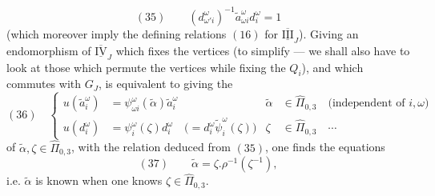 \[
(35)\qquad(d_{\omega'i}^\omega)^{-1}\widetilde a_{\omega i}^{\omega}d_i^\omega=1
\]
(which moreover imply the defining relations $(16)$ for $\overline{\underline{\mathrm{III}}}_J$). Giving an endomorphism of $\overline{\underline{\mathrm{IV}}}_J$ which fixes the  vertices (to simplify --- we shall also have to look at those which permute the vertices  while fixing the $Q_i$),  and which commutes with $G_J$, is equivalent to giving the
\[
(36)\quad\left\{\begin{aligned}
u(\widetilde a_i^\omega)&=\psi_{\omega i}^\omega(\widetilde\alpha)\widetilde a_i^\omega
&\widetilde\alpha&\in\widehat\Pi_{0,3}\quad\text{(independent of }i,\omega\text{)}\\
u(d_i^\omega)&=\psi_i^\omega(\zeta)d_i^\omega\quad\bigl(=d_i^\omega\widetilde\psi_i^\omega(\zeta)\bigr)
&\zeta&\in\widehat\Pi_{0,3}\quad\cdots
\end{aligned}\right.
\]
of $\widetilde\alpha,\zeta\in\widehat\Pi_{0,3}$, with the relation deduced from $(35)$, one finds the equations
\[
(37)\qquad\widetilde\alpha=\zeta.\rho^{-1}(\zeta^{-1}),
\]
i.e. $\widetilde\alpha$ is known when one knows $\zeta\in\widehat\Pi_{0,3}$.
